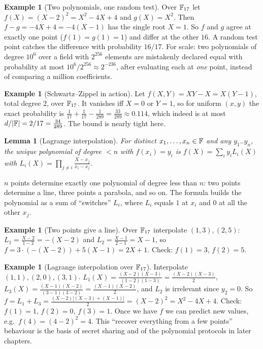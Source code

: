 \documentclass[11pt,a4paper]{report}
\theoremstyle{plain}
\newtheorem{lemma}[theorem]{Lemma}
\theoremstyle{definition}
\newtheorem{example}[theorem]{Example}
\theoremstyle{remark}
\begin{document}
\begin{example}[Two polynomials, one random test]
Over $\mathbb{F}_{17}$ let $f(X)=(X-2)^2=X^2-4X+4$ and $g(X)=X^2$. Then $f-g=-4X+4=-4(X-1)$ has the single root $X=1$. So $f$ and $g$ agree at exactly one point ($f(1)=g(1)=1$) and differ at the other $16$. A random test point catches the difference with probability $16/17$.
For scale: two polynomials of degree $10^6$ over a field with $2^{256}$ elements are mistakenly declared equal with probability at most $10^6/2^{256}\approx2^{-236}$, after evaluating each at \emph{one} point, instead of comparing a million coefficients.
\end{example}
\begin{example}[Schwartz--Zippel in action]
Let $f(X,Y)=XY-X=X(Y-1)$, total degree $2$, over $\mathbb{F}_{17}$. It vanishes iff $X=0$ or $Y=1$, so for uniform $(x,y)$ the exact probability is $\frac1{17}+\frac1{17}-\frac1{289}=\frac{33}{289}\approx0.114$, which indeed is at most $d/|\mathbb{F}|=2/17=\frac{34}{289}$. The bound is nearly tight here.
\end{example}
\begin{lemma}[Lagrange interpolation]
For distinct $x_1,\dots,x_n\in\mathbb{F}$ and any $y_1..y_n$, the unique polynomial of degree $<n$ with $f(x_i)=y_i$ is $f(X)=\sum_i y_i L_i(X)$ with $L_i(X)=\prod_{j\ne i}\frac{X-x_j}{x_i-x_j}$.
\end{lemma}
\begin{plain}\PE
$n$ points determine exactly one polynomial of degree less than $n$: two points determine a line, three points a parabola, and so on. The formula builds the polynomial as a sum of ``switches'' $L_i$, where $L_i$ equals $1$ at $x_i$ and $0$ at all the other $x_j$.
\end{plain}
\begin{example}[Two points give a line]
Over $\mathbb{F}_{17}$ interpolate $(1,3),(2,5)$: $L_1=\frac{X-2}{1-2}=-(X-2)$ and $L_2=\frac{X-1}{2-1}=X-1$, so $f=3\cdot(-(X-2))+5(X-1)=2X+1$. Check: $f(1)=3$, $f(2)=5$. \checkmark
\end{example}
\begin{example}[Lagrange interpolation over $\mathbb{F}_{17}$]
Interpolate $(1,1),(2,0),(3,1)$. $L_1(X)=\frac{(X-2)(X-3)}{(1-2)(1-3)}=\frac{(X-2)(X-3)}2$, $L_3(X)=\frac{(X-1)(X-2)}{(3-1)(3-2)}=\frac{(X-1)(X-2)}2$, and $L_2$ is irrelevant since $y_2=0$. So $f=L_1+L_3=\frac{(X-2)\big[(X-3)+(X-1)\big]}{2}=(X-2)^2=X^2-4X+4$. Check: $f(1)=1$, $f(2)=0$, $f(3)=1$. \checkmark
Once we have $f$ we can predict new values, e.g.\ $f(4)=(4-2)^2=4$. This ``recover everything from a few points'' behaviour is the basis of secret sharing and of the polynomial protocols in later chapters.
\end{example}
\end{document}
